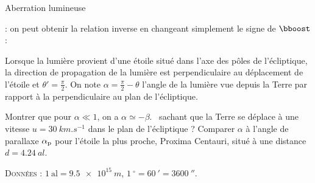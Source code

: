 \begin{exo}[PC][2][TD]{Aberration lumineuse}
\begin{quest}
{ : on peut obtenir la relation inverse en changeant simplement le signe de $\bboost$ :
}
\end{quest}
Lorsque la lumière provient d'une étoile situé dans l'axe des pôles de l'écliptique, la direction de propagation de la lumière est perpendiculaire au déplacement de l'étoile et $\theta' = \textstyle\frac{\pi}{2}$.
On note $\alpha = \textstyle\frac{\pi}{2}-\theta$ l'angle de la lumière vue depuis la Terre par rapport à la perpendiculaire au plan de l'écliptique.
\begin{quest}
  \item	
  Montrer que pour $\alpha \ll 1$, on a $\alpha \simeq -\beta$.
  \AN~sachant que la Terre se déplace à une vitesse $u=\SI{30}{km.s^{-1}}$ dans le plan de l'écliptique ? Comparer $\alpha$ à l'angle de parallaxe $\alpha_{\rm p}$ pour l'étoile la plus proche, Proxima Centauri, situé à une distance $d=\SI{4.24}{al}$. 
\end{quest}

\textsc{Données} : $1 \mathrm{~al} = \SI{9.5e15}{m}$, $\SI{1}{^\circ} = \SI{60}{'} = \SI{3600}{''}$.

\end{exo}


